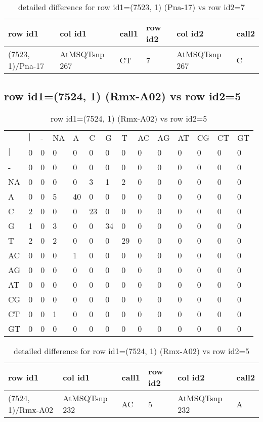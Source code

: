 \begin{center}
\begin{longtable}{|l|l|l|l|l|l|}
\caption{detailed difference for row id1=(7523, 1) (Pna-17) vs row id2=7} \label{table_dm335}\\
\hline
row id1&col id1&call1&row id2&col id2&call2\\
\hline
(7523, 1)/Pna-17&AtMSQTsnp 267&CT&7&AtMSQTsnp 267&C\\
\hline
\end{longtable}
\end{center}

\subsection{row id1=(7524, 1) (Rmx-A02) vs row id2=5}
\begin{center}
\begin{longtable}{|l|l|l|l|l|l|l|l|l|l|l|l|l|l|}
\caption{row id1=(7524, 1) (Rmx-A02) vs row id2=5} \label{table_dm336}\\
\hline
\\
\hline
&$|$&-&NA&A&C&G&T&AC&AG&AT&CG&CT&GT\\
$|$&0&0&0&0&0&0&0&0&0&0&0&0&0\\
-&0&0&0&0&0&0&0&0&0&0&0&0&0\\
NA&0&0&0&0&3&1&2&0&0&0&0&0&0\\
A&0&0&5&40&0&0&0&0&0&0&0&0&0\\
C&2&0&0&0&23&0&0&0&0&0&0&0&0\\
G&1&0&3&0&0&34&0&0&0&0&0&0&0\\
T&2&0&2&0&0&0&29&0&0&0&0&0&0\\
AC&0&0&0&1&0&0&0&0&0&0&0&0&0\\
AG&0&0&0&0&0&0&0&0&0&0&0&0&0\\
AT&0&0&0&0&0&0&0&0&0&0&0&0&0\\
CG&0&0&0&0&0&0&0&0&0&0&0&0&0\\
CT&0&0&1&0&0&0&0&0&0&0&0&0&0\\
GT&0&0&0&0&0&0&0&0&0&0&0&0&0\\
\hline
\end{longtable}
\end{center}

\begin{center}
\begin{longtable}{|l|l|l|l|l|l|}
\caption{detailed difference for row id1=(7524, 1) (Rmx-A02) vs row id2=5} \label{table_dm337}\\
\hline
row id1&col id1&call1&row id2&col id2&call2\\
\hline
(7524, 1)/Rmx-A02&AtMSQTsnp 232&AC&5&AtMSQTsnp 232&A\\
\hline
\end{longtable}
\end{center}

